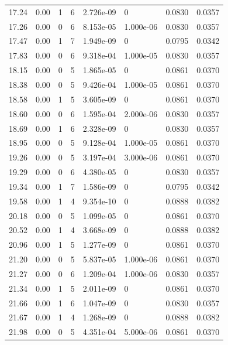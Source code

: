 \documentclass[preview]{standalone}
\begin{document}
{{{\begin{tabular}{L{1.2cm}C{1.2cm} C{0.3cm}C{0.5cm} C{1.4cm}C{1.4cm} C{1.4cm}C{1.4cm}}
  17.24  &  0.00  & 1     &  6 &  2.726e-09  & 0  & 0.0830 &  0.0357   \\ 
  17.26  &  0.00  & 0     &  6 &  8.153e-05  & 1.000e-06  & 0.0830 &  0.0357   \\ 
  17.47  &  0.00  & 1     &  7 &  1.949e-09  & 0  & 0.0795 &  0.0342   \\ 
  17.83  &  0.00  & 0     &  6 &  9.318e-04  & 1.000e-05  & 0.0830 &  0.0357   \\ 
  18.15  &  0.00  & 0     &  5 &  1.865e-05  & 0  & 0.0861 &  0.0370   \\ 
  18.38  &  0.00  & 0     &  5 &  9.426e-04  & 1.000e-05  & 0.0861 &  0.0370   \\ 
  18.58  &  0.00  & 1     &  5 &  3.605e-09  & 0  & 0.0861 &  0.0370   \\ 
  18.60  &  0.00  & 0     &  6 &  1.595e-04  & 2.000e-06  & 0.0830 &  0.0357   \\ 
  18.69  &  0.00  & 1     &  6 &  2.328e-09  & 0  & 0.0830 &  0.0357   \\ 
  18.95  &  0.00  & 0     &  5 &  9.128e-04  & 1.000e-05  & 0.0861 &  0.0370   \\ 
  19.26  &  0.00  & 0     &  5 &  3.197e-04  & 3.000e-06  & 0.0861 &  0.0370   \\ 
  19.29  &  0.00  & 0     &  6 &  4.380e-05  & 0  & 0.0830 &  0.0357   \\ 
  19.34  &  0.00  & 1     &  7 &  1.586e-09  & 0  & 0.0795 &  0.0342   \\ 
  19.58  &  0.00  & 1     &  4 &  9.354e-10  & 0  & 0.0888 &  0.0382   \\ 
  20.18  &  0.00  & 0     &  5 &  1.099e-05  & 0  & 0.0861 &  0.0370   \\ 
  20.52  &  0.00  & 1     &  4 &  3.668e-09  & 0  & 0.0888 &  0.0382   \\ 
  20.96  &  0.00  & 1     &  5 &  1.277e-09  & 0  & 0.0861 &  0.0370   \\ 
  21.20  &  0.00  & 0     &  5 &  5.837e-05  & 1.000e-06  & 0.0861 &  0.0370   \\ 
  21.27  &  0.00  & 0     &  6 &  1.209e-04  & 1.000e-06  & 0.0830 &  0.0357   \\ 
  21.34  &  0.00  & 1     &  5 &  2.011e-09  & 0  & 0.0861 &  0.0370   \\ 
  21.66  &  0.00  & 1     &  6 &  1.047e-09  & 0  & 0.0830 &  0.0357   \\ 
  21.67  &  0.00  & 1     &  4 &  1.268e-09  & 0  & 0.0888 &  0.0382   \\ 
  21.98  &  0.00  & 0     &  5 &  4.351e-04  & 5.000e-06  & 0.0861 &  0.0370   \\ 

\end{tabular}}}}
\end{document}
